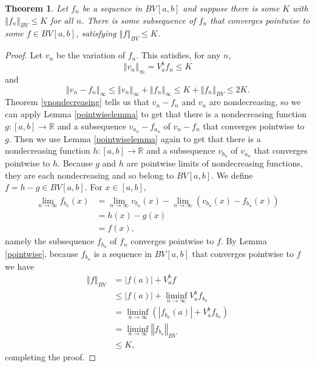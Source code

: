 \documentclass{article}
\newcommand{\norm}[1]{\left\Vert #1 \right\Vert}
\newtheorem{theorem}{Theorem}
\theoremstyle{definition}
\begin{document}
\begin{theorem}
Let $f_n$ be a sequence in $BV[a,b]$ and suppose there is some $K$ with
$\norm{f_n}_{BV} \leq K$ for all $n$. There is some subsequence of $f_n$ that converges
pointwise to some $f \in BV[a,b]$, satisfying $\norm{f}_{BV} \leq K$.
\end{theorem}
\begin{proof}
Let $v_n$ be the variation of $f_n$. This satisfies, for any $n$,
\[
\norm{v_n}_\infty = V_a^b f_n \leq K
\]
and
\[
\norm{v_n-f_n}_\infty \leq \norm{v_n}_\infty + \norm{f_n}_\infty \leq 
K+\norm{f_n}_{BV}
\leq 2K.
\]
Theorem \ref{vnondecreasing} tells us that $v_n-f_n$ and $v_n$ are nondecreasing, so we can apply Lemma \ref{pointwiselemma}
to get that there is a nondecreasing function $g:[a,b] \to \mathbb{R}$ and a subsequence
$v_{a_n}-f_{a_n}$ of $v_n-f_n$ that converges pointwise to $g$. Then we use Lemma \ref{pointwiselemma} again to get
that there is a nondecreasing function $h:[a,b] \to \mathbb{R}$ and a subsequence $v_{b_n}$ of $v_{a_n}$ that converges
pointwise to $h$. Because $g$ and $h$ are pointwise limits of nondecreasing functions, they are each nondecreasing and so belong
to $BV[a,b]$. 
We define $f=h-g \in BV[a,b]$. For $x \in [a,b]$,
\begin{align*}
\lim_{n \to \infty} f_{b_n}(x)& = \lim_{n \to \infty} v_{b_n}(x)-\lim_{n \to \infty} (v_{b_n}(x)-f_{b_n}(x))\\
&=h(x)-g(x)\\
&=f(x),
\end{align*}
namely the subsequence $f_{b_n}$ of $f_n$ converges pointwise to $f$. 
By Lemma \ref{pointwise}, because $f_{b_n}$ is a sequence in $BV[a,b]$ that converges pointwise to $f$ we have
\begin{align*}
\norm{f}_{BV}&=|f(a)|+V_a^b f \\
&\leq |f(a)|+\liminf_{n \to \infty}  V_a^b f_{b_n}\\
&=\liminf_{n \to \infty} \left( |f_{b_n}(a)|+V_a^b f_{b_n} \right)\\
&=\liminf_{n \to \infty} \norm{f_{b_n}}_{BV}\\
&\leq K,
\end{align*}
completing the proof.
\end{proof}
\end{document}

